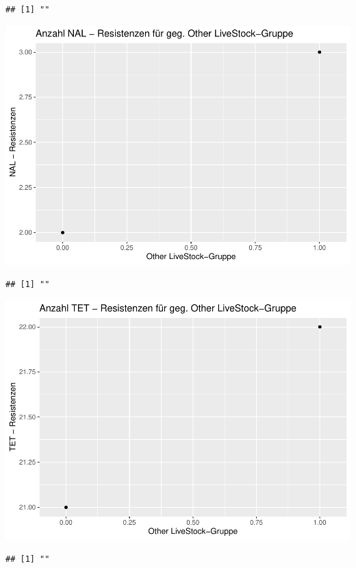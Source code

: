 \documentclass[
]{article}
\begin{document}
\begin{verbatim}
## [1] ""
\end{verbatim}

\includegraphics{NResistenzen_files/figure-latex/unnamed-chunk-7-17.pdf}

\begin{verbatim}
## [1] ""
\end{verbatim}

\includegraphics{NResistenzen_files/figure-latex/unnamed-chunk-7-18.pdf}

\begin{verbatim}
## [1] ""
\end{verbatim}
\end{document}
